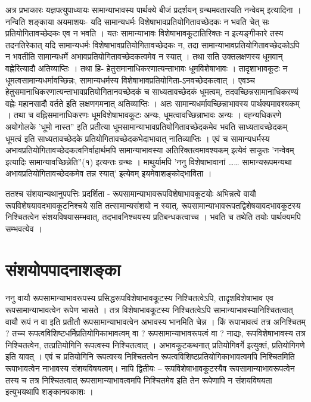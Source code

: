 अत्र प्रभाकारः यज्ञपत्युपाध्यायः सामान्याभावस्य पार्थक्ये बीजं प्रदर्शयन् ग्रन्थमवतारयति नन्वेवम् इत्यादिना । नन्विति शङ्काया अयमाशयः- यदि सामान्यधर्मः विशेषाभावप्रतियोगितावच्छेदकः न भवति चेत् सः प्रतियोगितावच्छेदकः एव न भवति ।  यतः सामान्याभावः विशेषाभावकूटातिरिक्तः न इत्यङ्गीकारे तस्य तदनतिरेकात् यदि सामान्यधर्मः विशेषाभावप्रतियोगितावच्छेदकः न, तदा सामान्याभावप्रतियोगितावच्छेदकोऽपि न भवतीति सामान्यधर्मे अभावप्रतियोगितावच्छेदकत्वमेव न स्यात् । तथा सति उक्तलक्षणस्य धूमवान् वह्नेरित्यादौ अतिव्याप्तिः । तथा हि- हेतुसमानाधिकरणात्यन्ताभावः धूमविशेषाभावः । तादृशाभावकूटः न धूमत्वसामान्यधर्मावच्छिन्नः, सामान्यधर्मस्य विशेषाभावप्रतियोगिता-ऽनवच्छेदकत्वात् । एवञ्च हेतुसमानाधिकरणात्यन्ताभावप्रतियोगितानवच्छेदकं च साध्यतावच्छेदकं धूमत्वम्, तदवच्छिन्नसामानाधिकरण्यं वह्नेः महानसादौ वर्तते इति लक्षणगमनात् अतिव्याप्तिः । अतः सामान्यधर्मावच्छिन्नाभावस्य पार्थक्यमावश्यकम् । तथा च वह्निसमानाधिकरणः धूमविशेषाभावकूटः अन्यः, धूमत्वावच्छिन्नाभावः अन्यः । वह्न्यधिकरणे अयोगोलके ’धूमो नास्त” इति प्रतीत्या धूमसामान्याभावप्रतियोगितावच्छेदकमेव भवति साध्यतावच्छेदकम् धूमत्वं इति साध्यतावच्छेदके प्रतियोगितावच्छेदकभेदाभावात् नातिव्याप्तिः । एवं च सामान्यधर्मस्य अभावप्रतियोगितावच्छेदकत्वनिर्वाहार्थमपि सामान्याभावस्या अतिरिक्तत्वमावश्यकम् इत्येवं साकूतः ’नन्वेवम् इत्यादिः सामान्यावच्छिन्नेति”(१) इत्यन्तः ग्रन्थः   । माथुर्यामपि ’ननु विशेषाभावानां …… सामान्यरूपमन्यथा अभावप्रतियोगितावच्छेदकमेव तन्न स्यात्’ इत्येवम् इयमेवाशङ्कोद्भाविता ।

ततश्च संशयान्यथानुपपत्तिः प्रदर्शिता - रूपसामान्याभावरूपविशेषाभावकूटयोः अभिन्नत्वे वायौ रूपविशेषयावदभावकूटनिश्चये सति तत्सामान्यसंशयो न स्यात्, रूपसामान्याभावरूपतद्विशेषयावदभावकूटस्य निश्चितत्वेन संशयविषयासम्भवात्, तदभावनिश्चयस्य प्रतिबन्धकत्वाच्च । भवति च तथेति तयोः पार्थक्यमपि सम्भवत्येव ।

\section*{संशयोपपादनाशङ्का}

ननु वायौ रूपसामान्याभावरूपस्य प्रसिद्धरूपविशेषाभावकूटस्य निश्चितत्वेऽपि, तादृशविशेषाभाव एव रूपसामान्याभावत्वेन रूपेण भासते । तत्र विशेषाभावकूटस्य निश्चितत्वेऽपि सामान्याभावस्यानिश्चितत्वात् वायौ रूपं न वा इति प्रतीतौ रूपसामान्याभावत्वेन अभावस्य भानमिति चेन्न । किं रूपाभावत्वं तत्र अनिश्चितम् ? तच्च रूपत्वविशिष्टधर्मिप्रतियोगिकाभावत्वम् वा ? रूपसामान्याभावरूपत्वं वा ? नाद्यः, रूपविशेषाभावस्य तत्र निश्चितत्वेन, तत्प्रतियोगिनि रूपत्वस्य निश्चितत्वात् । अभावकूटकथनात् प्रतियोगिवर्गे इत्युक्तं, प्रतियोगिगणे इति यावत् । एवं च प्रतियोगिनि रूपत्वस्य निश्चितत्वेन रूपत्वविशिष्टप्रतियोगिकाभावत्वमपि निश्चितमिति रूपाभावत्वेन नाभावस्य संशयविषयत्वम्। नापि द्वितीयः – रूपविशेषाभावकूटस्यैव रूपसामान्याभावरूपत्वेन तस्य च तत्र निश्चितत्वात् रूपसामान्याभावत्वमपि निश्चितमेव इति तेन रूपेणापि न संशयविषयता इत्युभयथापि शङ्कानवकाशः ।

